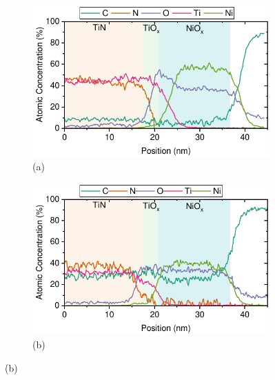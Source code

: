 \begin{figure}[htbp]
    \centering
    \begin{subfigure}[t]{0.49\textwidth}
        \centering
        \includegraphics[width=\textwidth]{chapters/material_properties/images/TEM_As_Dep.pdf} %
        \caption*{(a)}
    \end{subfigure}
    \hfill
    \begin{subfigure}[t]{0.49\textwidth}
        \centering
        \includegraphics[width=\textwidth]{chapters/material_properties/images/TEM_5_min.pdf} %
        \caption*{(b)}
    \end{subfigure}



\end{figure}
